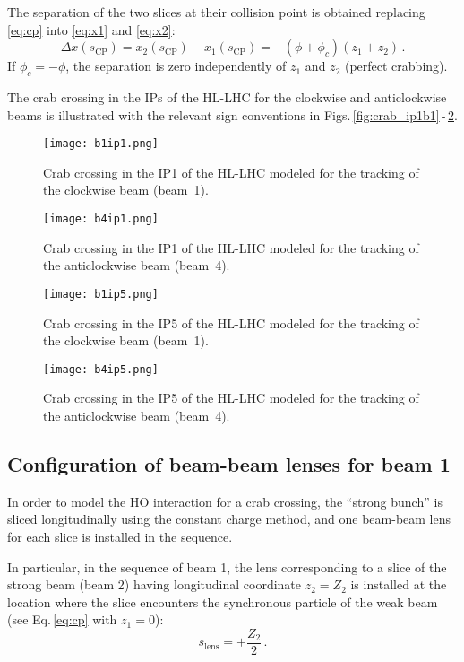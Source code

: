 The separation of the two slices at their collision point is obtained replacing \eqref{eq:cp} into \eqref{eq:x1} and \eqref{eq:x2}:
\begin{equation}
    \Delta x(s_\text{CP}) = x_2(s_\text{CP}) - x_1(s_\text{CP}) = 
    - (\phi + \phi_c) (z_1 + z_2)  \, .
\end{equation}
If $\phi_c = -\phi$, the separation is zero independently of $z_1$ and $z_2$ (perfect crabbing).

The crab crossing in the IPs of the HL-LHC for the clockwise and anticlockwise beams is illustrated with the relevant sign conventions in Figs.\,\ref{fig:crab_ip1b1}\,-\,\ref{fig:crab_ip5b4}.

\begin{figure}[p]
\centering
\texttt{[image: b1ip1.png]}
\caption{\small Crab crossing in the IP1 of the HL-LHC modeled for the tracking of the clockwise beam (beam~1).  \label{fig:crab_ip1b1}}
\texttt{[image: b4ip1.png]}
\caption{\small Crab crossing in the IP1 of the HL-LHC modeled for the tracking of the anticlockwise beam (beam~4). \label{fig:crab_ip1b4}}
\end{figure}

\begin{figure}[p]
\centering
\texttt{[image: b1ip5.png]}
\caption{\small Crab crossing in the IP5 of the HL-LHC modeled for the tracking of the clockwise beam (beam~1).  \label{fig:crab_ip5b1}}
\texttt{[image: b4ip5.png]}
\caption{\small Crab crossing in the IP5 of the HL-LHC modeled for the tracking of the anticlockwise beam (beam~4). \label{fig:crab_ip5b4}}
\end{figure}

\subsection{Configuration of beam-beam lenses for beam 1}

In order to model the HO interaction for a crab crossing, the ``strong bunch'' is sliced longitudinally using the constant charge method, and one beam-beam lens for each slice is installed in the sequence.

In particular, in the sequence of beam 1, the lens corresponding to a slice of the strong beam (beam 2) having longitudinal coordinate $z_2=Z_2$ is installed at the location where the slice encounters the synchronous particle of the weak beam (see Eq.\,\eqref{eq:cp} with $z_1 = 0$):
\begin{equation}
    s_\text{lens} = +\frac{Z_2}{2}
    \, .
    \label{eq:slens}
\end{equation}


